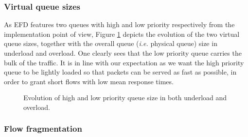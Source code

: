 \documentclass[preprint,12pt]{elsarticle}
\begin{document}
\subsubsection{Virtual queue sizes}

As EFD features two queues with high and low priority respectively from the implementation point of view, Figure \ref{fig:queue_evo} depicts the evolution of the two virtual queue sizes, together with the overall queue (\textit{i.e.} physical queue) size in underload and overload. One clearly sees that the low priority queue carries the bulk of the traffic. It is in line with our expectation as we want the high priority queue to be lightly loaded so that packets can be served as fast as possible, in order to grant short flows with low mean response times. 


\begin{figure}[ht]
  \centering
  \caption{Evolution of high and low priority queue size  in both underload and overload.}
  \label{fig:queue_evo}
\end{figure}


\subsubsection{Flow fragmentation} \label{sec:fragmentation}
\end{document}
